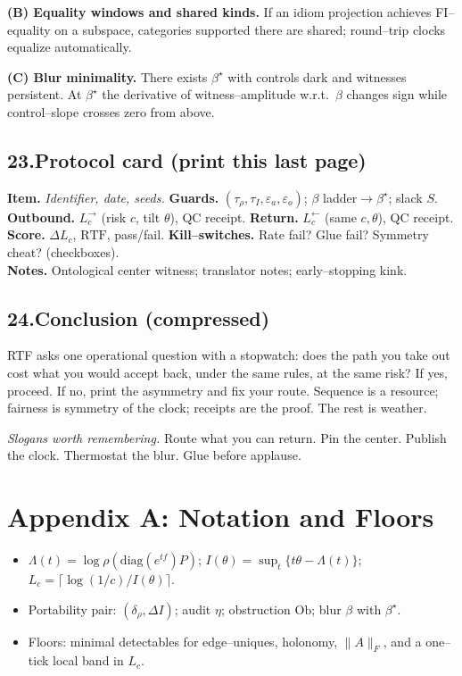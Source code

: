 \documentclass[11pt]{article}
\begin{document}
\textbf{(B) Equality windows and shared kinds.} If an idiom projection achieves FI--equality on a subspace, categories supported there are shared; round--trip clocks equalize automatically.

\textbf{(C) Blur minimality.} There exists $\beta^\star$ with controls dark and witnesses persistent. At $\beta^\star$ the derivative of witness--amplitude w.r.t.\ $\beta$ changes sign while control--slope crosses zero from above.

\subsection*{23.\quad Protocol card (print this last page)}
\textbf{Item.} \emph{Identifier, date, seeds.}\quad
\textbf{Guards.} $(\tau_{\rho},\tau_I,\varepsilon_a,\varepsilon_o)$; $\beta$ ladder$\to\beta^\star$; slack $S$.\\
\textbf{Outbound.} $L^{\rightarrow}_c$ (risk $c$, tilt $\theta$), QC receipt.\quad
\textbf{Return.} $L^{\leftarrow}_c$ (same $c,\theta$), QC receipt.\\
\textbf{Score.} $\Delta L_c$, $\mathrm{RTF}$, pass/fail.\quad
\textbf{Kill--switches.} Rate fail? Glue fail? Symmetry cheat? (checkboxes).\\
\textbf{Notes.} Ontological center witness; translator notes; early--stopping kink.

\subsection*{24.\quad Conclusion (compressed)}
RTF asks one operational question with a stopwatch: does the path you take out cost what you would accept back, under the same rules, at the same risk? If yes, proceed. If no, print the asymmetry and fix your route. Sequence is a resource; fairness is symmetry of the clock; receipts are the proof. The rest is weather.

\bigskip

\noindent\emph{Slogans worth remembering.} Route what you can return. Pin the center. Publish the clock. Thermostat the blur. Glue before applause.

\appendix
\section*{Appendix A: Notation and Floors}
\begin{itemize}[leftmargin=1.2em]
\item $\Lambda(t)=\log\rho(\mathrm{diag}(e^{tf})P)$; $I(\theta)=\sup_t\{t\theta-\Lambda(t)\}$; $L_c=\lceil\log(1/c)/I(\theta)\rceil$.
\item Portability pair: $(\delta_\rho,\Delta I)$; audit $\eta$; obstruction $\mathrm{Ob}$; blur $\beta$ with $\beta^\star$.
\item Floors: minimal detectables for edge--uniques, holonomy, $\|A\|_F$, and a one--tick local band in $L_c$.
\end{itemize}
\end{document}
